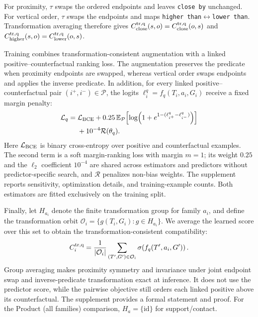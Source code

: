 For proximity, $\tau$ swaps the ordered endpoints and leaves \texttt{close by}
unchanged. For vertical order, $\tau$ swaps the endpoints and maps
\texttt{higher than}$\leftrightarrow$\texttt{lower than}. Transformation
averaging therefore gives
$C^{\rm tr,q}_{\rm close}(s,o)=C^{\rm tr,q}_{\rm close}(o,s)$ and
$C^{\rm tr,q}_{\rm higher}(s,o)=C^{\rm tr,q}_{\rm lower}(o,s)$.

Training combines transformation-consistent augmentation with a linked
positive--counterfactual ranking loss. The augmentation preserves the predicate when proximity endpoints
are swapped, whereas vertical order swaps endpoints and applies the inverse
predicate. In addition,
for every linked positive--counterfactual pair $(i^+,i^-)\in\mathcal P$, the
logits $\ell_i^q=f_q(T_i,a_i,G_i)$ receive a fixed margin penalty:
\begin{equation}
\begin{aligned}
\mathcal L_q={}&\mathcal L_{\rm BCE}
+0.25\,\mathbb E_{\mathcal P}\!
 \left[\log\!\left(1+e^{1-(\ell^q_{i^+}-\ell^q_{i^-})}\right)\right]\\
&+10^{-4}\mathcal R(\theta_q).
\end{aligned}
\end{equation}
Here $\mathcal L_{\rm BCE}$ is binary cross-entropy over positive and
counterfactual examples. The second term is a soft margin-ranking loss with
margin $m=1$; its weight $0.25$ and the $\ell_2$ coefficient $10^{-4}$ are
shared across estimators and predictors without predictor-specific search, and
$\mathcal R$ penalizes non-bias weights. The
supplement reports sensitivity, optimization details, and training-example
counts. Both estimators are fitted exclusively on the training split.

Finally, let $H_{a_i}$ denote the finite transformation group for family
$a_i$, and define the transformation orbit
$\mathcal O_i=\{g(T_i,G_i):g\in H_{a_i}\}$. We average the learned score over
this set to obtain the transformation-consistent compatibility:
\begin{equation}
C_i^{\rm tr,q}=\frac{1}{|\mathcal O_i|}
\sum_{(T',G')\in\mathcal O_i} \sigma\!\left(f_q(T',a_i,G')\right).
\label{eq:algebra-projection}
\end{equation}
Group averaging makes proximity symmetry and invariance under joint endpoint
swap and inverse-predicate transformation exact at inference. It does not use
the predictor score, while the pairwise objective still orders each linked
positive above its counterfactual. The supplement provides a formal statement
and proof. For the Product (all families) comparison, $H_a=\{\mathrm{id}\}$
for support/contact.

